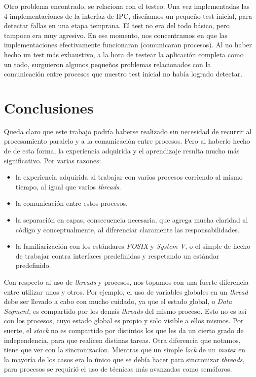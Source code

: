 \documentclass[a4paper,10pt]{article}
\begin{document}
Otro problema encontrado, se relaciona con el testeo. Una vez implementadas las 4 implementaciones de la interfaz de IPC, diseñamos un pequeño test inicial, para detectar fallas en una 
etapa temprana. El test no era del todo básico, pero tampoco era muy agresivo. En ese momento, nos concentramos en que las implementaciones efectivamente funcionaran (comunicaran
 procesos). Al no haber hecho un test más exhaustivo, a la hora de testear la aplicación completa como un todo, surguieron algunos pequeños problemas relacionados con la 
 comunicación entre procesos que nuestro test inicial no había logrado detectar.\\

\newpage
\section{Conclusiones}

Queda claro que este trabajo podría haberse realizado sin necesidad de recurrir al procesamiento paralelo y a la comunicación entre procesos. Pero al haberlo 
hecho de de esta forma, la experiencia adquirida y el aprendizaje resulta mucho más significativo. Por varias razones:

\begin{itemize}
\item la experiencia adquirida al trabajar con varios procesos corriendo al mismo tiempo, al igual que varios \textit{threads}.
\item la comunicación entre estos procesos.
\item la separación en capas, consecuencia necesaria, que agrega mucha claridad al código y conceptualmente, al diferenciar claramente las responsabilidades.
\item la familiarización con los estándares \textit{POSIX} y \textit{System V}, o el simple de hecho de trabajar contra interfaces predefinidas y respetando
      un estándar predefinido.
\end{itemize}

Con respecto al uso de \textit{threads}  y procesos, nos topamos con una fuerte diferencia entre utilizar unos y otros. Por ejemplo, el uso de variables globales 
en un \textit{thread} debe ser llevado a cabo con mucho cuidado, ya que el estado global, o \textit{Data Segment}, es compartido por los demás \textit{threads} del mismo
proceso. Esto no es así con los procesos, cuyo estado global es propio y solo visible a ellos mismos. Por suerte, el \textit{stack} no es compartido por distintos 
los que les da un cierto grado de independencia, para que realicen distinas tareas. Otra diferencia que notamos, tiene que ver con la sincronizacíon. Mientras que un
simple \textit{lock} de un \textit{mutex} en la mayoría de los casos era lo único que se debía hacer para sincronizar \textit{threads}, para procesos se requirió el uso
de técnicas más avanzadas como semáforos.
\end{document}
